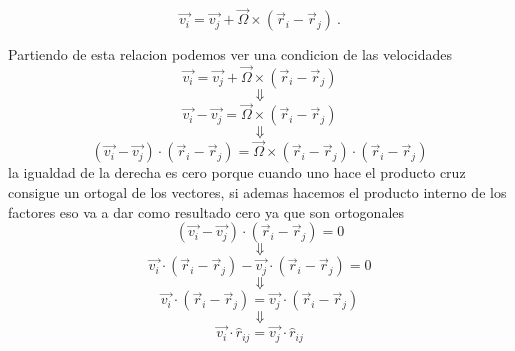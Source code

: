 \documentclass[../Main.tex]{subfiles}
\begin{document}
\npage{
}
{
    \begin{equation}
        \vec{v_i} = \vec{v_j} + \vec{\Omega} \times \left( \vec{r}_{i} - \vec{r}_{j} \right) \ .
    \end{equation}

    Partiendo de esta relacion podemos ver una condicion de las velocidades
    \begin{equation*}
        \vec{v_i} = \vec{v_j} + \vec{\Omega} \times \left( \vec{r}_{i} - \vec{r}_{j} \right)
    \end{equation*}
    \begin{equation*}
        \Downarrow
    \end{equation*}
    \begin{equation*}
        \vec{v_i} - \vec{v_j} = \vec{\Omega} \times \left( \vec{r}_{i} - \vec{r}_{j} \right)
    \end{equation*}
    \begin{equation*}
        \Downarrow
    \end{equation*}
    \begin{equation*}
        \left( \vec{v_i} - \vec{v_j} \right) \cdot \left( \vec{r}_{i} - \vec{r}_{j} \right) = \vec{\Omega} \times \left( \vec{r}_{i} - \vec{r}_{j} \right) \cdot \left( \vec{r}_{i} - \vec{r}_{j} \right)
    \end{equation*}
    la igualdad de la derecha es cero porque cuando uno hace el producto cruz
    consigue un ortogal de los vectores, si ademas hacemos el producto interno de 
    los factores eso va a dar como resultado cero ya que son ortogonales
    \begin{equation*}
        \left( \vec{v_i} - \vec{v_j} \right) \cdot \left( \vec{r}_{i} - \vec{r}_{j} \right) = 0
    \end{equation*}
    \begin{equation*}
        \Downarrow
    \end{equation*}
    \begin{equation*}
        \vec{v_i} \cdot \left( \vec{r}_{i} - \vec{r}_{j} \right) - \vec{v_j} \cdot \left( \vec{r}_{i} - \vec{r}_{j} \right) = 0
    \end{equation*}
    \begin{equation*}
        \Downarrow
    \end{equation*}
    \begin{equation*}
        \vec{v_i} \cdot \left( \vec{r}_{i} - \vec{r}_{j} \right) = \vec{v_j} \cdot \left( \vec{r}_{i} - \vec{r}_{j} \right)
    \end{equation*}
    \begin{equation*}
        \Downarrow
    \end{equation*}
    \begin{equation*}
        \vec{v_i} \cdot \hat{r}_{ij} = \vec{v_j} \cdot \hat{r}_{ij}
    \end{equation*}

}
\end{document}
